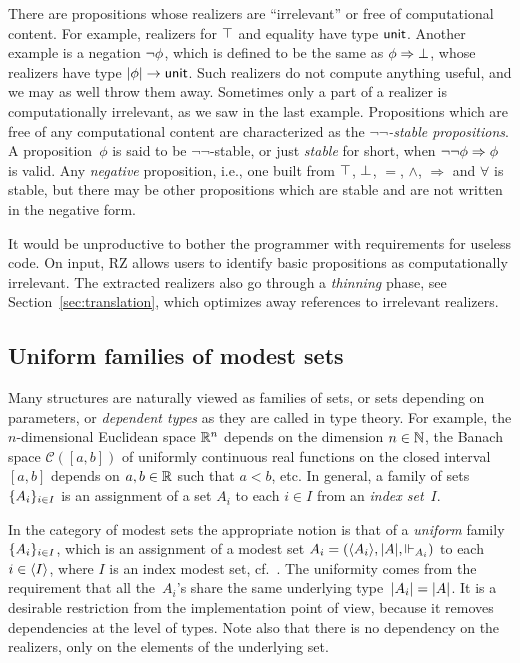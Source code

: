 There are propositions whose realizers are ``irrelevant'' or free of
computational content. For example, realizers for $\top$ and
equality have type $\mathsf{unit}$. Another example is a negation
$\lnot \phi$, which is defined to be the same as
$\phi\Rightarrow \bot$, whose realizers have type
$|\phi| \to \mathsf{unit}$. Such realizers do not compute
anything useful, and we may as well throw them away. Sometimes only a
part of a realizer is computationally irrelevant, as we saw in the
last example. Propositions which are free of any computational content
are characterized as the \emph{$\lnot\lnot$-stable propositions}. A
proposition~$\phi$ is said to be $\lnot\lnot$-stable, or just
\emph{stable} for short, when $\lnot \lnot \phi\Rightarrow \phi$ is
valid. Any \emph{negative} proposition, i.e., one built from $\top$,
$\bot$, $=$, $\land$, $\Rightarrow$ and $\forall$ is stable, but
there may be other propositions which are stable and are not written
in the negative form.

It would be unproductive to bother the programmer with requirements
for useless code.  On input, RZ allows users to identify basic propositions
as computationally irrelevant.  The extracted
realizers also go through a \emph{thinning} phase, see Section~\ref{sec:translation}, which
optimizes away references to irrelevant realizers.


\subsection{Uniform families of modest sets}
\label{sec:uniform-families}

Many structures are naturally viewed as families of sets, or sets
depending on parameters, or \emph{dependent types} as they are called
in type theory. For example, the $n$-dimensional Euclidean space
$\mathbb{R}^n$ depends on the dimension $n \in \mathbb{N}$, the Banach space
$\mathcal{C}([a,b])$ of uniformly continuous real functions on the
closed interval $[a,b]$ depends on $a, b \in \mathbb{R}$ such that $a < b$,
etc. In general, a family of sets $\{A_i\}_{i \in I}$ is an
assignment of a set $A_i$ to each $i \in I$ from an \emph{index
  set}~$I$.

In the category of modest sets the appropriate notion is that of a
\emph{uniform} family~$\{A_i\}_{i \in I}$, which is an assignment
of a modest set $A_i = (\langle A_i \rangle, |A|, {\Vdash_{A_i}})$ to each
$i \in \langle I \rangle$, where $I$ is an index modest set,
cf.~\cite{Jacobs,Birkedal}. The uniformity comes from the requirement
that all the~$A_i$'s share the same underlying type~$|A_i| =
|A|$. It is a desirable restriction from the implementation
point of view, because it removes dependencies at the level of types.
Note also that there is no dependency on the realizers, only on the
elements of the underlying set.

